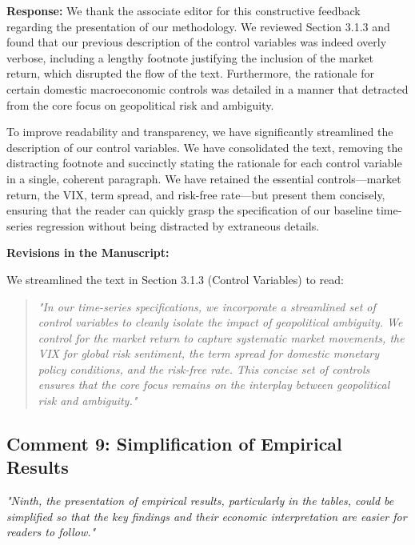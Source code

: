 \documentclass[12pt]{article}
\begin{document}
\begin{highlightbox}
\textbf{Response:} We thank the associate editor for this constructive feedback regarding the presentation of our methodology. We reviewed Section 3.1.3 and found that our previous description of the control variables was indeed overly verbose, including a lengthy footnote justifying the inclusion of the market return, which disrupted the flow of the text. Furthermore, the rationale for certain domestic macroeconomic controls was detailed in a manner that detracted from the core focus on geopolitical risk and ambiguity.

To improve readability and transparency, we have significantly streamlined the description of our control variables. We have consolidated the text, removing the distracting footnote and succinctly stating the rationale for each control variable in a single, coherent paragraph. We have retained the essential controls—market return, the VIX, term spread, and risk-free rate—but present them concisely, ensuring that the reader can quickly grasp the specification of our baseline time-series regression without being distracted by extraneous details.
\end{highlightbox}

\begin{highlightbox}
\textbf{Revisions in the Manuscript:}

We streamlined the text in Section 3.1.3 (Control Variables) to read:
\vspace{0.2cm}
\begin{quote}
\color{red}\itshape "In our time-series specifications, we incorporate a streamlined set of control variables to cleanly isolate the impact of geopolitical ambiguity. We control for the market return to capture systematic market movements, the VIX for global risk sentiment, the term spread for domestic monetary policy conditions, and the risk-free rate. This concise set of controls ensures that the core focus remains on the interplay between geopolitical risk and ambiguity."
\end{quote}
\end{highlightbox}

\subsection*{Comment 9: Simplification of Empirical Results}
\textit{"Ninth, the presentation of empirical results, particularly in the tables, could be simplified so that the key findings and their economic interpretation are easier for readers to follow."}
\end{document}
